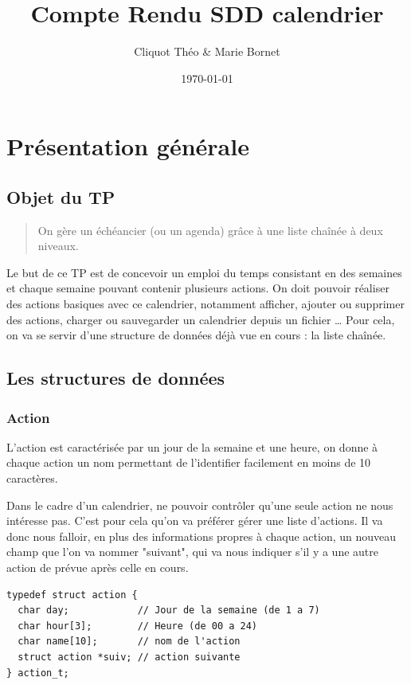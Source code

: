 \documentclass[11pt]{article}
\author{Cliquot Théo \& Marie Bornet}
\date{\today}
\title{Compte Rendu SDD calendrier}
\begin{document}
\maketitle
\tableofcontents


\section{Présentation générale}
\label{sec:org1a4716e}

\subsection{Objet du TP}
\label{sec:orgdc848c9}
\begin{quote}
On gère un échéancier (ou un agenda) grâce à une liste chaînée à deux niveaux.
\end{quote}

Le but de ce TP est de concevoir un emploi du temps consistant en des semaines
et chaque semaine pouvant contenir plusieurs actions. On doit pouvoir réaliser
des actions basiques avec ce calendrier, notamment afficher, ajouter ou
supprimer des actions, charger ou sauvegarder un calendrier depuis un fichier
\ldots{}
Pour cela, on va se servir d'une structure de données déjà vue en cours : la
liste chaînée.


\subsection{Les structures de données}
\label{sec:orgcf1e9f9}

\subsubsection{Action}
\label{sec:org2b26dcb}

L'action est caractérisée par un jour de la semaine et une heure, on donne à
chaque action un nom permettant de l'identifier facilement en moins de 10
caractères.


Dans le cadre d'un calendrier, ne pouvoir contrôler qu'une seule action ne nous
intéresse pas. C'est pour cela qu'on va préférer gérer une liste d'actions. Il va donc nous falloir, en plus des informations propres à chaque action, un nouveau
champ que l'on va nommer "suivant", qui va nous indiquer s'il y a une autre
action de prévue après celle en cours.

\begin{lstlisting}
typedef struct action {
  char day;            // Jour de la semaine (de 1 a 7)
  char hour[3];        // Heure (de 00 a 24)
  char name[10];       // nom de l'action
  struct action *suiv; // action suivante
} action_t;
\end{lstlisting}
\end{document}
